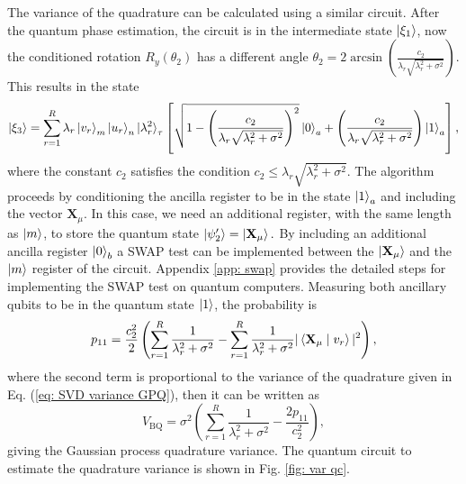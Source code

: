\documentclass[10pt]{article}
\begin{document}
	The variance of the quadrature can be calculated using a similar circuit.
	After the quantum phase estimation, the circuit is in the intermediate state $\ket{\xi_1}$, now the conditioned rotation $R_y(\theta_2)$ has a different angle $\theta_2 = 2\arcsin\left(\frac{c_2}{\lambda_r\sqrt{\lambda_r^2 + \sigma^2}}\right)$. This results in the state
	\begin{equation}
		\ket{\xi_3} = \sum_{r=1}^{R}\lambda_{r} \ket{v_{r}}_m \ket{u_{r}}_n \ket{\lambda_{r}^{2}}_\tau \left[\sqrt{1 - \left(\frac{c_2}{\lambda_r \sqrt{\lambda_r^2 + \sigma^2}}\right)^2}\ket{0}_a + \left(\frac{c_2}{\lambda_r \sqrt{\lambda_r^2 + \sigma^2}}\right)\ket{1}_a\right],
	\end{equation}
	where the constant $c_2$ satisfies the condition $c_2\leq\lambda_r \sqrt{\lambda_r^2 + \sigma^2}$.
	The algorithm proceeds by conditioning the ancilla register to be in the state $\ket{1}_a$ and including the vector $\mathbf{X}_{\mu}$. In this case, we need an additional register, with the same length as $\ket{m}$, to store the quantum state $\ket{\psi_2 '} = \ket{\mathbf{X}_\mu}.$ By including an additional ancilla register $\ket{0}_b$ a SWAP test can be implemented between the $\ket{\mathbf{X}_\mu}$ and the $\ket{m}$ register of the circuit. Appendix \ref{app: swap} provides the detailed steps for implementing the SWAP test on quantum computers.  Measuring both ancillary qubits to be in the quantum state $\ket{1}$, the probability is
	\begin{equation}
		p_{11} = \frac{c_2^2}{2}\left( \sum_{r=1}^R \frac{1}{\lambda_r^2 + \sigma^2} - \sum_{r=1}^R \frac{1}{\lambda_r^2 + \sigma^2} |\braket{\mathbf{X}_\mu\mid v_r}|^2 \right),
	\end{equation}
	where the second term is proportional to the variance of the quadrature given in Eq. (\ref{eq: SVD variance GPQ}), then it can be written as
	\begin{equation}
		V_{\mathrm{BQ}}= \sigma^2\left( \sum_{r=1}^R \frac{1}{\lambda_r^2 + \sigma^2} - \frac{2p_{11}}{c_2^2}\right),
	\end{equation}
	giving the Gaussian process quadrature variance. The quantum circuit to estimate the quadrature variance is shown in Fig. \ref{fig: var qc}.
\end{document}

